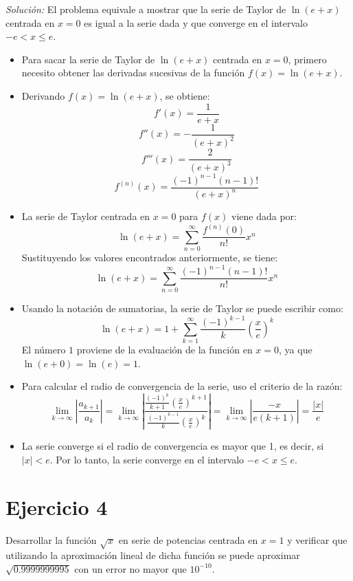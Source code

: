 \documentclass{article}
\newenvironment{solution}
    {\textit{Solución:}}
    {}
\begin{document}
\begin{solution}
El problema equivale a mostrar que la serie de Taylor de $\ln(e+x)$ centrada en $x = 0$ es igual a la serie dada y que converge en el intervalo $-e < x \leq e$.
    \begin{itemize}
        \item Para sacar la serie de Taylor de $\ln(e+x)$ centrada en $x = 0$, primero necesito obtener las derivadas sucesivas de la función $f(x) = \ln(e+x)$.
        \item Derivando $f(x) = \ln(e+x)$, se obtiene:
        $$f'(x) = \frac{1}{e+x}$$
        $$f''(x) = -\frac{1}{{(e+x)}^2}$$
        $$f'''(x) = \frac{2}{{(e+x)}^3}$$
        $$f^{(n)}(x) = \frac{(-1)^{n-1}(n-1)!}{{(e+x)}^n}$$
        \item La serie de Taylor centrada en $x = 0$ para $f(x)$ viene dada por:
        \begin{equation*}
            \ln(e+x) = \sum_{n=0}^\infty \frac{f^{(n)}(0)}{n!}x^n
        \end{equation*}
        Sustituyendo los valores encontrados anteriormente, se tiene:
        \begin{equation*}
            \ln(e+x) = \sum_{n=0}^\infty \frac{(-1)^{n-1}(n-1)!}{n!}x^n
        \end{equation*}
        \item Usando la notación de sumatorias, la serie de Taylor se puede escribir como:
        \begin{equation*}
            \ln(e+x) = 1 + \sum_{k=1}^\infty \frac{(-1)^{k-1}}{k}\left( \frac{x}{e} \right)^k
        \end{equation*}
        El número $1$ proviene de la evaluación de la función en $x = 0$, ya que $\ln(e+0) = \ln(e) = 1$.
        \item Para calcular el radio de convergencia de la serie, uso el criterio de la razón:
        $$\lim_{k \to \infty} \left| \frac{a_{k+1}}{a_k} \right| = \lim_{k \to \infty} \left| \frac{\frac{(-1)^{k}}{k+1}\left( \frac{x}{e} \right)^{k+1}}{\frac{(-1)^{k-1}}{k}\left( \frac{x}{e} \right)^k} \right| = \lim_{k \to \infty} \left| \frac{-x}{e(k+1)} \right| = \frac{|x|}{e}$$
        \item La serie converge si el radio de convergencia es mayor que 1, es decir, si $|x| < e$. Por lo tanto, la serie converge en el intervalo $-e < x \leq e$.
    \end{itemize}
\end{solution}

\newpage
\section*{Ejercicio 4}
Desarrollar la función $\sqrt{x}$ en serie de potencias centrada en $x = 1$ y verificar que utilizando la aproximación lineal de dicha función se puede aproximar $\sqrt{0.9999999995}$ con un error no mayor que $10^{-10}$.
\end{document}
